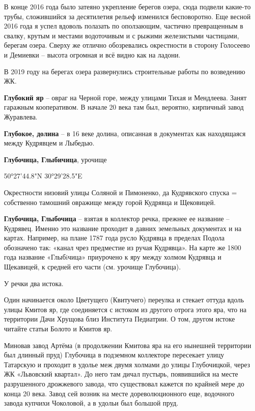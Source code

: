 В конце 2016 года было затеяно укрепление берегов озера, сюда подвели какие-то трубы, сложившийся за десятилетия рельеф изменился бесповоротно. Еще весной 2016 года я успел вдоволь полазать по оползающим, частично превращенным в свалку, крутым и местами водоточивым и с рыжими железистыми частицами, берегам озера. Сверху же отлично обозревались окрестности в сторону Голосеево и Демиевки – высота огромная и всё видно как на ладони.

В 2019 году на берегах озера развернулись строительные работы по возведению ЖК.\\

\medskip

\textbf{Глубокий яр} – овраг на Черной горе, между улицами Тихая и Мендлеева. Занят гаражным кооперативом. В начале 20 века там был, вероятно, кирпичный завод Журавлева.\\

\medskip

\textbf{Глубокое, долина} – в 16 веке долина, описанная в документах как находящаяся между Кудрявцем и Лыбедью.\\

\medskip

\textbf{Глубочица, Глыбичица}, урочище

50°27'44.8"N 30°29'28.5"E

Окрестности низовий улицы Соляной и Пимоненко, да Кудрявского спуска = собственно тамошний овражище между горой Кудрявца и Щековицей.\\

\medskip


\textbf{Глубочица, Глыбочица} – взятая в коллектор речка, прежнее ее название – Кудрявец. Именно это название проходит в давних земельных документах и на картах. Например, на плане 1787 года русло Кудрявца в пределах Подола обозначено так: «канал чрез предместие из ручая Кудрявца». На карте же 1800 года название «Глыбiчица» приурочено к яру между холмом Кудрявца и Щекавицей, к средней его части (см. урочище Глубочица).

У речки два истока. 

Один начинается около Цветущего (Квитучего) переулка и стекает оттуда вдоль улицы Кмитов яр, где соединяется с истоком из другого отрога этого яра, что на территории Дачи Хрущова близ Института Педиатрии. О том, другом истоке читайте статьи Болото и Кмитов яр.

Миновав завод Артёма (в продолжении Кмитова яра на его нынешней территории был длинный пруд) Глубочица в подземном коллекторе пересекает улицу Татарскую и проходит в удолье меж двумя холмами до улицы Глубочицкой, через ЖК «Львовский квартал». До него там дичал пустырь, появившийся на месте разрушенного дрожжевого завода, что существовал кажется по крайней мере до конца 20 века. Завод сей возник на месте дореволюционного еще, водочного завода купчихи Чоколовой, а в удольи был большой пруд.

